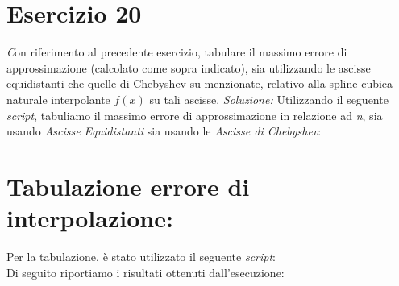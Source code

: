 \section{Esercizio 20}

\textit
Con riferimento al precedente esercizio, tabulare il massimo errore di approssimazione (calcolato come sopra indicato), sia utilizzando le ascisse equidistanti che quelle di Chebyshev su menzionate, relativo alla spline cubica naturale interpolante $f(x)$ su tali ascisse.
\newline
\noindent\emph{Soluzione: }\newline
Utilizzando il seguente \emph{script}, tabuliamo il massimo errore di approssimazione in relazione ad \emph{n}, sia usando \emph{Ascisse Equidistanti} sia usando le \emph{Ascisse di Chebyshev}:
\section*{Tabulazione errore di interpolazione:}

\newpage
Per la tabulazione, è stato utilizzato il seguente \emph{script}:\\

Di seguito riportiamo i risultati ottenuti dall'esecuzione:\\ \\
